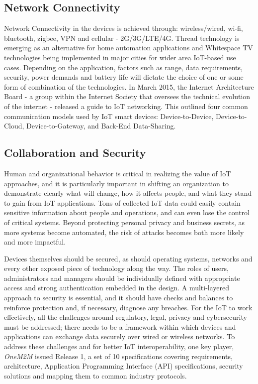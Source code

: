 \documentclass[sigconf]{acmart}
\begin{document}
\subsection{Network Connectivity}
Network Connectivity in the devices is achieved through: wireless/wired, wi-fi, bluetooth, zigbee, VPN and cellular - 2G/3G/LTE/4G. Thread technology is emerging as an alternative for home automation applications and Whitespace TV technologies being implemented in major cities for wider area IoT-based use cases. Depending on the application, factors such as range, data requirements, security, power demands and battery life will dictate the choice of one or some form of combination of the technologies. In March 2015, the Internet Architecture Board - a group within the Internet Society that oversees the technical evolution of the internet - released a guide to IoT networking. This outlined four common communication models used by IoT smart devices: Device-to-Device, Device-to-Cloud, Device-to-Gateway, and Back-End Data-Sharing\cite{5InternetSociety}.

\subsection{Collaboration and Security}
Human and organizational behavior is critical in realizing the value of IoT approaches, and it is particularly important in shifting an organization to demonstrate clearly what will change, how it affects people, and what they stand to gain from IoT applications. Tons of collected IoT data could easily contain sensitive information about people and operations, and can even lose the control of critical systems. Beyond protecting personal privacy and business secrets, as more systems become automated, the risk of attacks becomes both more likely and more impactful. 

Devices themselves should be secured, as should operating systems, networks and every other exposed piece of technology along the way. The roles of users, administrators and managers should be individually defined with appropriate access and strong authentication embedded in the design. A multi-layered approach to security is essential, and it should have checks and balances to reinforce protection and, if necessary, diagnose any breaches. For the IoT to work effectively, all the challenges around regulatory, legal, privacy and cybersecurity must be addressed; there needs to be a framework within which devices and applications can exchange data securely over wired or wireless networks. To address these challenges and for better IoT interoperability, one key player, {\em OneM2M} issued Release 1, a set of 10 specifications covering requirements, architecture, Application Programming Interface (API) specifications, security solutions and mapping them to common industry protocols\cite{6OneM2M}.
\end{document}
